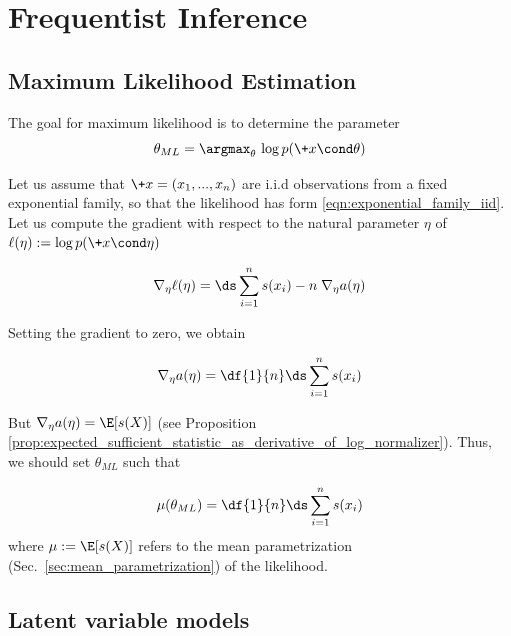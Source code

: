 \documentclass{article} %
\newcommand{\logNormalizerFunction}{a}
\newcommand{\sufficientStatsFunction}{s}
\newcommand{\meanParameter}{\mu}
\newcommand{\param}{\theta}
\newcommand{\naturalParam}{\eta}
\begin{document}
\section{Frequentist Inference}

\subsection{Maximum Likelihood Estimation}
\label{sec:ml_with_ef}


The goal for maximum likelihood is to determine the parameter
\begin{equation}
\label{eqn:ml}
\param_{ML} = \argmax_\param  \, \log p(\+x \cond \param) 
\end{equation}

Let us assume that $\+x=(x_1, ..., x_n)$ are i.i.d observations  from a fixed exponential family, so that the likelihood has form \eqref{eqn:exponential_family_iid}.  Let us compute the gradient with respect to the natural parameter $\naturalParam$ of $\ell(\naturalParam) := \log p(\+x \cond \naturalParam)$

\[ \nabla_\naturalParam \ell(\naturalParam) = \ds\sum_{i=1}^n \sufficientStatsFunction(x_i) - n \; \nabla_\naturalParam \logNormalizerFunction(\naturalParam) \]

Setting the gradient to zero, we obtain

\[ \nabla_\naturalParam \logNormalizerFunction(\naturalParam) = \df{1}{n}  \ds\sum_{i=1}^n \sufficientStatsFunction(x_i) \]

But $\nabla_\naturalParam \logNormalizerFunction(\naturalParam) = \E [\sufficientStatsFunction(X)]$  (see Proposition \ref{prop:expected_sufficient_statistic_as_derivative_of_log_normalizer}).  Thus, we should set $\param_{ML}$ such that
%

\begin{align}
\meanParameter(\param_{ML}) = \df{1}{n} \ds\sum_{i=1}^n \sufficientStatsFunction(x_i) 	
 \label{eqn:maximum_likelihood_solution_for_exponential_families}
\end{align}
%
where $\meanParameter:= \E[\sufficientStatsFunction(X)]$ refers to the mean parametrization (Sec.~\ref{sec:mean_parametrization}) of the likelihood.  

\subsection{Latent variable models}
\end{document}
